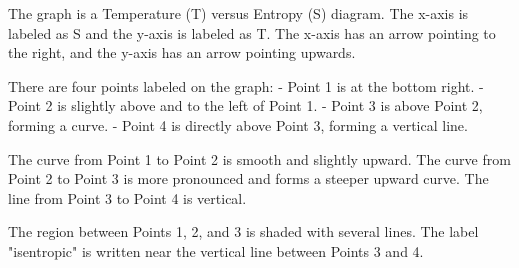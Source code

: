 The graph is a Temperature (T) versus Entropy (S) diagram. The x-axis is labeled as S and the y-axis is labeled as T. The x-axis has an arrow pointing to the right, and the y-axis has an arrow pointing upwards.

There are four points labeled on the graph:
- Point 1 is at the bottom right.
- Point 2 is slightly above and to the left of Point 1.
- Point 3 is above Point 2, forming a curve.
- Point 4 is directly above Point 3, forming a vertical line.

The curve from Point 1 to Point 2 is smooth and slightly upward. The curve from Point 2 to Point 3 is more pronounced and forms a steeper upward curve. The line from Point 3 to Point 4 is vertical.

The region between Points 1, 2, and 3 is shaded with several lines. The label "isentropic" is written near the vertical line between Points 3 and 4.